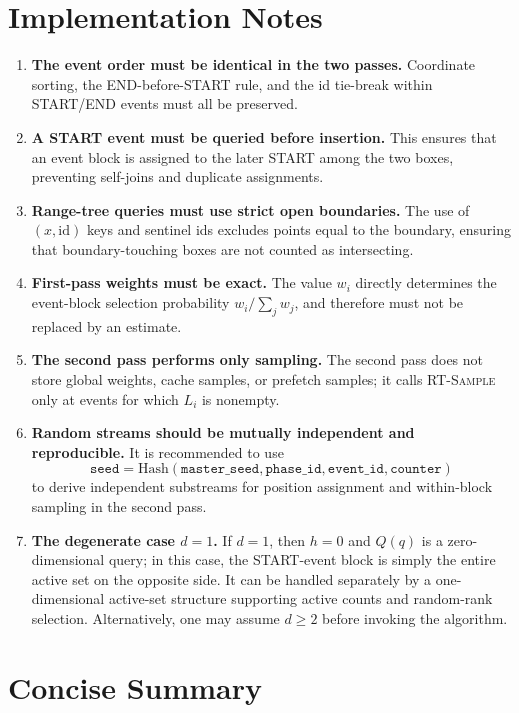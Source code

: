 \documentclass[11pt]{article}
\newcommand{\id}{\mathrm{id}}
\begin{document}
\section{Implementation Notes}

\begin{enumerate}[leftmargin=2em]
  \item \textbf{The event order must be identical in the two passes.} Coordinate sorting, the END-before-START rule, and the id tie-break within START/END events must all be preserved.
  \item \textbf{A START event must be queried before insertion.} This ensures that an event block is assigned to the later START among the two boxes, preventing self-joins and duplicate assignments.
  \item \textbf{Range-tree queries must use strict open boundaries.} The use of \((x,\id)\) keys and sentinel ids excludes points equal to the boundary, ensuring that boundary-touching boxes are not counted as intersecting.
  \item \textbf{First-pass weights must be exact.} The value \(w_i\) directly determines the event-block selection probability \(w_i/\sum_j w_j\), and therefore must not be replaced by an estimate.
  \item \textbf{The second pass performs only sampling.} The second pass does not store global weights, cache samples, or prefetch samples; it calls \textsc{RT-Sample} only at events for which \(L_i\) is nonempty.
  \item \textbf{Random streams should be mutually independent and reproducible.} It is recommended to use
  \[
    \texttt{seed}=\mathrm{Hash}(\texttt{master\_seed},\texttt{phase\_id},\texttt{event\_id},\texttt{counter})
  \]
  to derive independent substreams for position assignment and within-block sampling in the second pass.
  \item \textbf{The degenerate case \(d=1\).} If \(d=1\), then \(h=0\) and \(Q(q)\) is a zero-dimensional query; in this case, the START-event block is simply the entire active set on the opposite side. It can be handled separately by a one-dimensional active-set structure supporting active counts and random-rank selection. Alternatively, one may assume \(d\ge2\) before invoking the algorithm.
\end{enumerate}

\section{Concise Summary}
\end{document}
